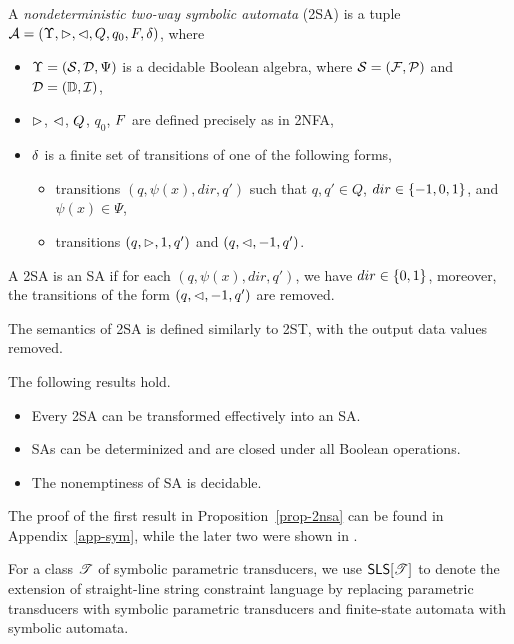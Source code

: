 \begin{definition}
    A \emph{nondeterministic two-way  symbolic \emph{automata}} (2SA) is a tuple $\mathcal{A} = (\Upsilon, \vartriangleright, \vartriangleleft, Q, q_0, F, \delta)$, where  
\begin{itemize}
\item $\Upsilon=(\mathcal{S}, \mathcal{D}, \Psi)$ is a decidable Boolean algebra, where $\mathcal{S} = ({\mathcal{F}}, {\mathcal{P}})$ and $\mathcal{D} = (\mathbb{D}, \mathcal{I})$,
%
\item $\vartriangleright$, $\vartriangleleft$, $Q$, $q_0$, $F$ are defined precisely as in 2NFA, 
%
\item $\delta$ is a finite set of  transitions of one of the following forms,
\begin{itemize}
\item   transitions $(q, \psi(x), dir, q')$ such that $q, q' \in Q$, $dir \in \{-1, 0, 1\}$, and $\psi(x) \in \Psi$, 
%
\item   transitions $(q, \vartriangleright, 1, q')$ and $(q, \vartriangleleft, -1, q')$. 
\end{itemize}
\end{itemize}
A 2SA is an SA if for each $(q, \psi(x), dir, q')$, we have $dir \in \{0, 1\}$, moreover, the transitions of the form $(q, \vartriangleleft, -1, q')$ are removed.
\end{definition}

The semantics of 2SA is defined similarly to 2ST, with the output data values removed.

\begin{proposition}\label{prop-2nsa}
The following results hold.
\begin{itemize}
\item Every 2SA can be transformed effectively into an SA.
%
\item SAs can be determinized and are closed under all Boolean operations.
%
\item The nonemptiness of SA is decidable.
\end{itemize}
\end{proposition}
The proof of the first result in Proposition~\ref{prop-2nsa} can be found in Appendix~\ref{app-sym}, while the later two were shown in \cite{NG01,DV14}.

For a class $\mathscr{T}$ of symbolic parametric transducers, we use $\textsf{SLS}[\mathscr{T}]$ to denote the extension of straight-line string constraint language by replacing parametric transducers with symbolic parametric transducers and finite-state automata with symbolic automata.

